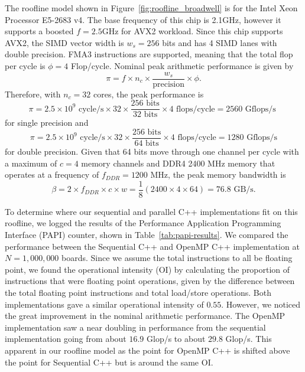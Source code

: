 \documentclass[12pt]{article}
\begin{document}
The roofline model shown in Figure~\ref{fig:roofline_broadwell} is for the Intel Xeon Processor E5-2683 v4. The base frequency of this chip is 2.1GHz, however it supports a boosted $f = 2.5$GHz for AVX2 workload. Since this chip supports AVX2, the SIMD vector width is $w_s = 256$ bits and has 4 SIMD lanes with double precision. FMA3 instructions are supported, meaning that the total flop per cycle is $\phi = 4$ Flop/cycle. Nominal peak arithmetic performance is given by
\begin{equation}
    \pi = f \times n_c \times \frac{w_s}{\mbox{precision}} \times \phi. \label{eq:peak-arithmetic}
\end{equation}
Therefore, with $n_c=32$ cores, the peak performance is
\begin{equation}
    \pi = 2.5 \times 10^9 \mbox{ cycle/s} \times 32 \times \frac{256 \mbox{ bits}}{32 \mbox{ bits}} \times 4 \mbox{ flops/cycle}  = 2560 \mbox{ Gflops/s }
\end{equation}
for single precision and
\begin{equation}
    \pi = 2.5 \times 10^9 \mbox{ cycle/s} \times 32 \times \frac{256 \mbox{ bits}}{64 \mbox{ bits}} \times 4 \mbox{ flops/cycle}  = 1280 \mbox{ Gflops/s}
\end{equation}
for double precision. Given that 64 bits move through one channel per cycle with a maximum of $c=4$ memory channels and DDR4 2400 MHz memory that operates at a frequency of $f_{DDR} = 1200$ MHz, the peak memory bandwidth is
\begin{equation}
    \beta = 2 \times f_{DDR} \times c \times w = \frac{1}{8}(2400 \times 4 \times 64) = 76.8 \mbox{ GB/s}.
\end{equation}

To determine where our sequential and parallel C++ implementations fit on this roofline, we logged the results of the Performance Application Programming Interface (PAPI) counter, shown in Table~\ref{tab:papi-results}. We compared the performance between the Sequential C++ and OpenMP C++ implementation at $N = 1,000,000$ boards. Since we assume the total instructions to all be floating point, we found the operational intensity (OI) by calculating the proportion of instructions that were floating point operations, given by the difference between the total floating point instructions and total load/store operations. Both implementations gave a similar operational intensity of $0.55$. However, we noticed the great improvement in the nominal arithmetic performance. The OpenMP implementation saw a near doubling in performance from the sequential implementation going from about $16.9$ Glop/s to about $29.8$ Glop/s. This apparent in our roofline model as the point for OpenMP C++ is shifted above the point for Sequential C++ but is around the same OI. 
\end{document}
